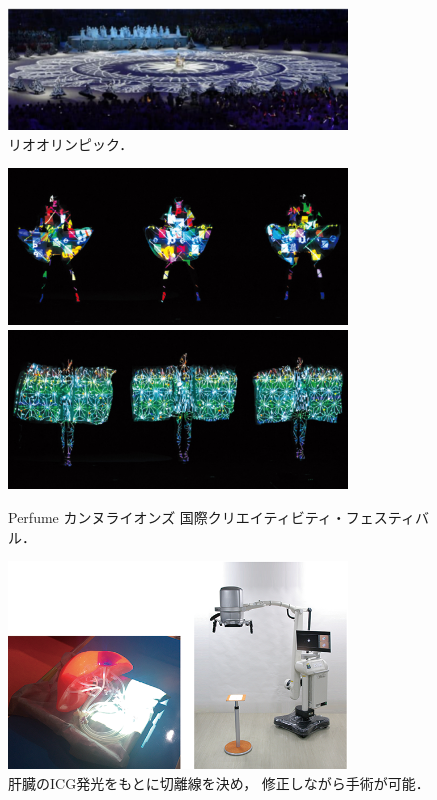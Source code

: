 \begin{figure}[b]
    \centering
    \includegraphics[width=9cm]{image/rio.png}
    \caption[リオオリンピック]{リオオリンピック\cite{rioprojection}．}
  \label{rio}
\end{figure}

\clearpage

\begin{figure}[t]
    \centering
    \includegraphics[width=9cm]{image/perfume1.png}
    \includegraphics[width=9cm]{image/perfume2.png}
    \caption[Perfume カンヌライオンズ 国際クリエイティビティ・フェスティバル]{Perfume カンヌライオンズ 
    \protect\linebreak 国際クリエイティビティ・フェスティバル\cite{kirameku}．}
  \label{perfume}
\end{figure}



\begin{figure}[b]
  \centering
  \includegraphics[width=9cm]{image/syujutsu.png}
  \caption[肝臓のICG発光をもとに切離線を決め，修正しながら手術が可能]{肝臓のICG発光をもとに切離線を決め，
  \protect\linebreak 修正しながら手術が可能\cite{iryou}．}
\label{syujutsu}
\end{figure}

